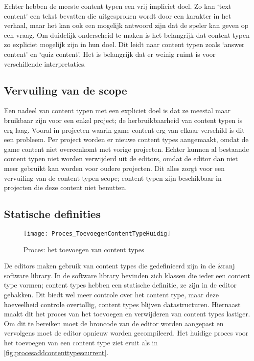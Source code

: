 Echter hebben de meeste content typen een vrij impliciet doel. Zo kan ‘text content’ een tekst bevatten die uitgesproken wordt door een karakter in het verhaal, maar het kan ook een mogelijk antwoord zijn dat de speler kan geven op een vraag. Om duidelijk onderscheid te maken is het belangrijk dat content typen zo expliciet mogelijk zijn in hun doel. Dit leidt naar content typen zoals ‘answer content’ en ‘quiz content’. Het is belangrijk dat er weinig ruimt is voor verschillende interpretaties.

\subsection{Vervuiling van de scope}
Een nadeel van content typen met een expliciet doel is dat ze meestal maar bruikbaar zijn voor een enkel project; de herbruikbaarheid van content typen is erg laag. Vooral in projecten waarin game content erg van elkaar verschild is dit een probleem. Per project worden er nieuwe content types aangemaakt, omdat de game content niet overeenkomt met vorige projecten. Echter kunnen al bestaande content typen niet worden verwijderd uit de editors, omdat de editor dan niet meer gebruikt kan worden voor oudere projecten. Dit alles zorgt voor een vervuiling van de content typen scope; content typen zijn beschikbaar in projecten die deze content niet benutten.

\pagebreak

\subsection{Statische definities}
\label{subsec:statischedefinities}
\begin{wrapfigure}{r}{0.4\textwidth}
    \texttt{[image: Proces\_ToevoegenContentTypeHuidig]}
    \caption{Proces: het toevoegen van content types}
    \label{fig:procesaddcontenttypescurrent}
    \centering
\end{wrapfigure}
De editors maken gebruik van content types die gedefinieerd zijn in de \&ranj software library. In de software library bevinden zich klassen die ieder een content type vormen; content types hebben een statische definitie, ze zijn in de editor gebakken. Dit biedt wel meer controle over het content type, maar deze hoeveelheid controle overtollig, content types blijven datastructuren. Hiernaast maakt dit het proces van het toevoegen en verwijderen van content types lastiger. Om dit te bereiken moet de broncode van de editor worden aangepast en vervolgens moet de editor opnieuw worden gecompileerd. Het huidige proces voor het toevoegen van een content type ziet eruit als in \autoref{fig:procesaddcontenttypescurrent}.

